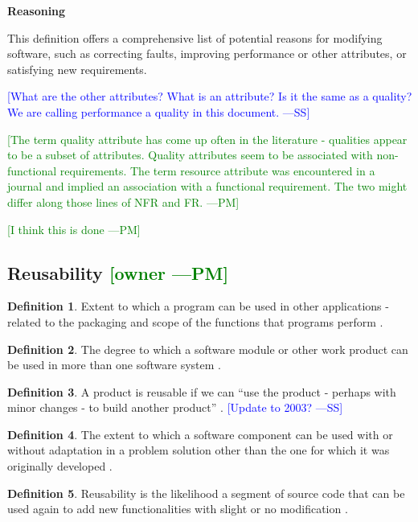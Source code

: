 \documentclass[letterpaper, cleveref]{lipics-v2019}
\newcommand{\authornote}[3]{\textcolor{#1}{[#3 ---#2]}}
\newcommand{\authornote}[3]{}
\newcommand{\wss}[1]{\authornote{blue}{SS}{#1}} %
\newcommand{\pmi}[1]{\authornote{green}{PM}{#1}} %
\theoremstyle{definition}
\newtheorem{defn}{Definition}
\begin{document}
\noindent \textbf{Reasoning}

This definition offers a comprehensive list of potential reasons for modifying
software, such as correcting faults, improving performance or other attributes,
or satisfying new requirements.

\wss{What are the other attributes?  What is an attribute?  Is it the same
as a quality?  We are calling performance a quality in this document.}

\pmi{The term quality attribute has come up often in the literature -
qualities appear to be a subset of attributes. Quality attributes seem to be
associated with non-functional requirements. The term resource attribute was
encountered in a journal and implied an association with a functional
requirement. The two might differ along those lines of NFR and FR.}

\pmi{I think this is done}


\subsection{Reusability \pmi{owner}}

\begin{defn}
  Extent to which a program can be used in other applications - related to
  the packaging and scope of the functions that programs perform
  \citep{McCallEtAl1977}.
\end{defn}

\begin{defn}
  The degree to which a software module or other work product can be used in
  more than one software system \citep{IEEEStdGlossarySET1990}.
\end{defn}

\begin{defn}
  A product is reusable if we can ``use the product - perhaps with minor changes
  - to build another product'' \citep{ghezzi1991fundamentals}.  \wss{Update
  to 2003?}
\end{defn}

\begin{defn} \label{ReusabilityDefnSelected}
  The extent to which a software component can be used with or without
  adaptation in a problem solution other than the one for which it was
  originally developed \citep{kalagiakos2003non}.
\end{defn}

\begin{defn}
  Reusability is the likelihood a segment of source code that can be used
  again to add new functionalities with slight or no modification
  \citep{sandhu2010survey}.
\end{defn}
\end{document}
